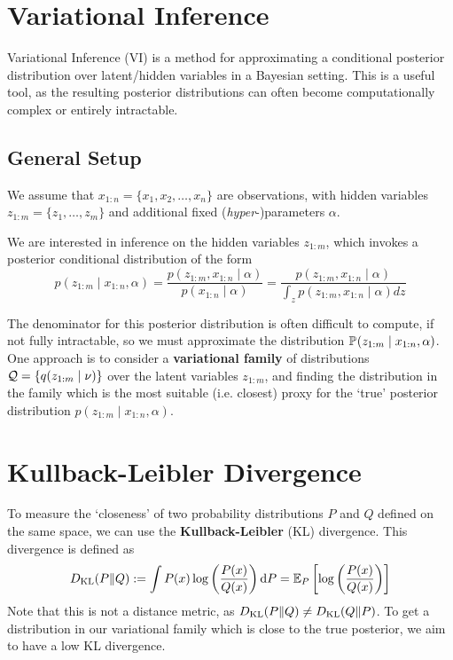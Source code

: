 \documentclass[11pt]{article}
\numberwithin{figure}{section}
\numberwithin{equation}{section}
\begin{document}
\section{Variational Inference}

Variational Inference (VI) is a method for approximating a conditional posterior distribution over latent/hidden variables in a Bayesian setting. This is a useful tool, as the resulting posterior distributions can often become computationally complex or entirely intractable. 

\subsection{General Setup}
We assume that ${x}_{1:n} = \{x_{1}, x_{2}, \dots, x_{n}\}$ are observations, with hidden variables ${z}_{1:m} = \{z_1, \dots, z_m\}$ and additional fixed (\textit{hyper}-)parameters $\alpha$. 

We are interested in inference on the hidden variables ${z}_{1:m}$, which invokes a posterior conditional distribution of the form 
\begin{equation}
    p(z_{1:m} \mid x_{1:n}, \alpha) = \frac{p(z_{1:m}, x_{1:n} \mid \alpha)}{p(x_{1:n} \mid \alpha)} = \frac{p(z_{1:m}, x_{1:n} \mid \alpha)}{\int_{z}p(z_{1:m}, x_{1:n} \mid \alpha)dz}
\end{equation}

The denominator for this posterior distribution is often difficult to compute, if not fully intractable, so we must approximate the distribution $\mathbb{P}_{}(z_{1:m}\mid x_{1:n}, \alpha)$. One approach is to consider a \textbf{variational family} of distributions $\mathcal{Q} = \{q(z_{1:m} \mid \nu)\}$ over the latent variables $z_{1:m}$, and finding the distribution in the family which is the most suitable (i.e. closest) proxy for the `true' posterior distribution $p(z_{1:m} \mid x_{1:n}, \alpha)$.

\section{Kullback-Leibler Divergence}
To measure the `closeness' of two probability distributions $P$ and $Q$ defined on the same space, we can use the \textbf{Kullback-Leibler} (KL) divergence. This divergence is defined as 
\begin{equation}
    D_{\textrm{KL}}({P}\Vert{Q}) := \int P(x)\log\left(\frac{P(x)}{Q(x)}\right)\textrm{d}P = \mathbb{E}_{P}\left[\log\left(\frac{P(x)}{Q(x)}\right)\right]
\end{equation}
Note that this is not a distance metric, as $D_{\textrm{KL}}({P}\Vert{Q}) \ne D_{\textrm{KL}}({Q}\Vert{P})$. To get a distribution in our variational family which is close to the true posterior, we aim to have a low KL divergence.
\end{document}
